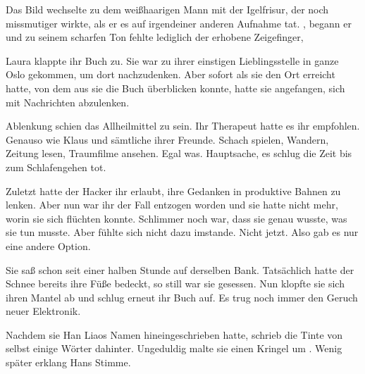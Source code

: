 \par

 Das Bild wechselte zu dem weißhaarigen Mann mit der Igelfrisur, der noch missmutiger wirkte, als er es auf irgendeiner anderen Aufnahme tat. , begann er und zu seinem scharfen Ton fehlte lediglich der erhobene Zeigefinger, 

\par

Laura klappte ihr Buch zu. Sie war zu ihrer einstigen Lieblingsstelle in ganze Oslo gekommen, um dort nachzudenken. Aber sofort als sie den Ort erreicht hatte, von dem aus sie die Buch überblicken konnte, hatte sie angefangen, sich mit Nachrichten abzulenken.

\par

Ablenkung schien das Allheilmittel zu sein. Ihr Therapeut hatte es ihr empfohlen. Genauso wie Klaus und sämtliche ihrer Freunde. Schach spielen, Wandern, Zeitung lesen, Traumfilme ansehen. Egal was. Hauptsache, es schlug die Zeit bis zum Schlafengehen tot.

\par

Zuletzt hatte der Hacker ihr erlaubt, ihre Gedanken in produktive Bahnen zu lenken. Aber nun war ihr der Fall entzogen worden und sie hatte nicht mehr, worin sie sich flüchten konnte. Schlimmer noch war, dass sie genau wusste, was sie tun musste. Aber fühlte sich nicht dazu imstande. Nicht jetzt. Also gab es nur eine andere Option.

\par

Sie saß schon seit einer halben Stunde auf derselben Bank. Tatsächlich hatte der Schnee bereits ihre Füße bedeckt, so still war sie gesessen. Nun klopfte sie sich ihren Mantel ab und schlug erneut ihr Buch auf. Es trug noch immer den Geruch neuer Elektronik.

\par

Nachdem sie Han Liaos Namen hineingeschrieben hatte, schrieb die Tinte von selbst einige Wörter dahinter. Ungeduldig malte sie einen Kringel um . Wenig später erklang Hans Stimme. 

